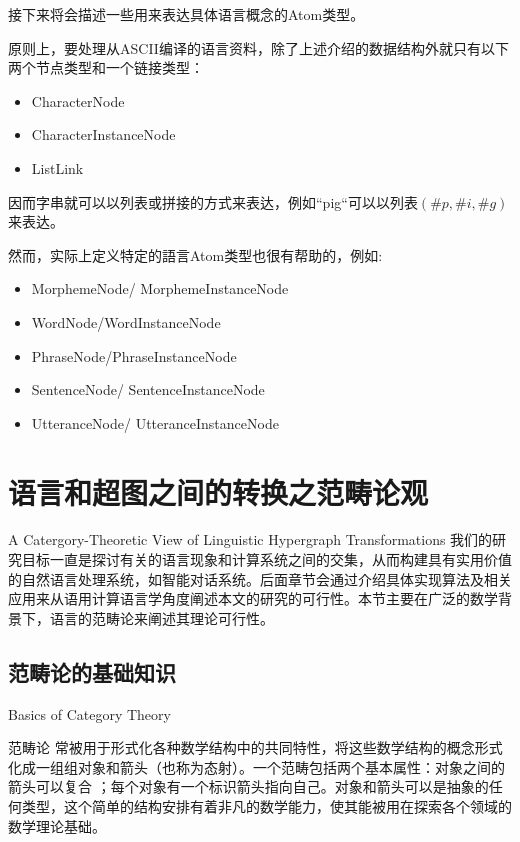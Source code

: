 接下来将会描述一些用来表达具体语言概念的Atom类型。

原则上，要处理从ASCII编译的语言资料，除了上述介绍的数据结构外就只有以下两个节点类型和一个链接类型：

\begin{itemize}
\item CharacterNode
\item CharacterInstanceNode
\item ListLink
\end{itemize}

\noindent 因而字串就可以以列表或拼接的方式来表达，例如“pig“可以以列表$(\#p, \#i, \#g)$来表达。

然而，实际上定义特定的語言Atom类型也很有帮助的，例如:

\begin{itemize}
\item  	MorphemeNode/ MorphemeInstanceNode
\item		WordNode/WordInstanceNode
\item		PhraseNode/PhraseInstanceNode
\item		SentenceNode/ SentenceInstanceNode
\item		UtteranceNode/ UtteranceInstanceNode
\end{itemize}


\section{语言和超图之间的转换之范畴论观}{A Catergory-Theoretic View of Linguistic Hypergraph Transformations}
我们的研究目标一直是探讨有关的语言现象和计算系统之间的交集，从而构建具有实用价值的自然语言处理系统，如智能对话系统。后面章节会通过介绍具体实现算法及相关应用来从语用计算语言学角度阐述本文的研究的可行性。本节主要在广泛的数学背景下，语言的范畴论来阐述其理论可行性。

\subsection{范畴论的基础知识}{Basics of Category Theory}

范畴论 \cite{LawvereSchanuel97}常被用于形式化各种数学结构中的共同特性，将这些数学结构的概念形式化成一组组对象和箭头（也称为态射）。一个范畴包括两个基本属性：对象之间的箭头可以复合 ；每个对象有一个标识箭头指向自己。对象和箭头可以是抽象的任何类型，这个简单的结构安排有着非凡的数学能力，使其能被用在探索各个领域的数学理论基础。

